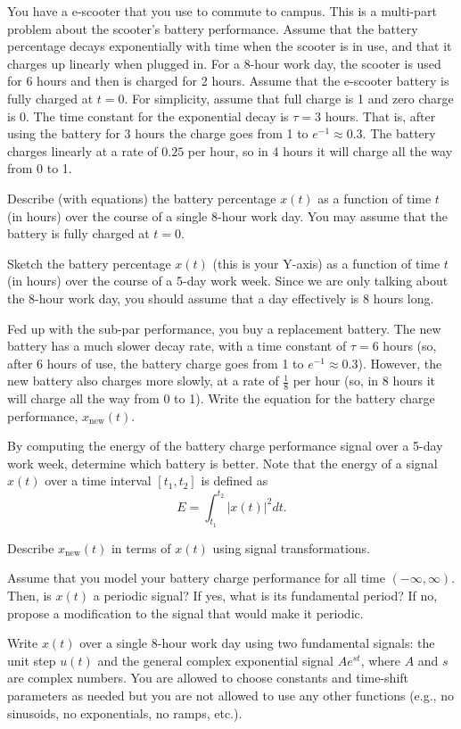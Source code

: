 \documentclass{ee102_pset}
\author{\rule{3cm}{0.4pt}} %
\begin{document}
You have a e-scooter that you use to commute to campus. This is a multi-part problem about the scooter's battery performance. Assume that the battery percentage decays exponentially with time when the scooter is in use, and that it charges up linearly when plugged in. For a 8-hour work day, the scooter is used for 6 hours and then is charged for 2 hours. Assume that the e-scooter battery is fully charged at $t=0$. For simplicity, assume that full charge is 1 and zero charge is 0. The time constant for the exponential decay is $\tau=3$ hours. That is, after using the battery for 3 hours the charge goes from 1 to $e^{-1} \approx 0.3$. The battery charges linearly at a rate of $0.25$ per hour, so in 4 hours it will charge all the way from 0 to 1.

\problempart Describe (with equations) the battery percentage $x(t)$ as a function of time $t$ (in hours) over the course of a single 8-hour work day. You may assume that the battery is fully charged at $t=0$.

\problempart Sketch the battery percentage $x(t)$ (this is your Y-axis) as a function of time $t$ (in hours) over the course of a 5-day work week. Since we are only talking about the 8-hour work day, you should assume that a day effectively is 8 hours long. 

\problempart Fed up with the sub-par performance, you buy a replacement battery. The new battery has a much slower decay rate, with a time constant of $\tau=6$ hours (so, after 6 hours of use, the battery charge goes from 1 to $e^{-1} \approx 0.3$). However, the new battery also charges more slowly, at a rate of $\frac{1}{8}$ per hour (so, in 8 hours it will charge all the way from 0 to 1). Write the equation for the battery charge performance, $x_{\text{new}}(t)$.

\problempart By computing the energy of the battery charge performance signal over a 5-day work week, determine which battery is better. Note that the energy of a signal $x(t)$ over a time interval $[t_1,t_2]$ is defined as
\[
E = \int_{t_1}^{t_2} |x(t)|^2 dt.
\]

\problempart Describe $x_{\text{new}}(t)$ in terms of $x(t)$ using signal transformations.

\problempart Assume that you model your battery charge performance for all time $(-\infty, \infty)$. Then, is $x(t)$ a periodic signal? If yes, what is its fundamental period? If no, propose a modification to the signal that would make it periodic.

\problempart Write $x(t)$ over a single 8-hour work day using two fundamental signals: the unit step $u(t)$ and the general complex exponential signal $Ae^{st}$, where $A$ and $s$ are complex numbers. You are allowed to choose constants and time-shift parameters as needed but you are not allowed to use any other functions (e.g., no sinusoids, no exponentials, no ramps, etc.).
\end{document}
